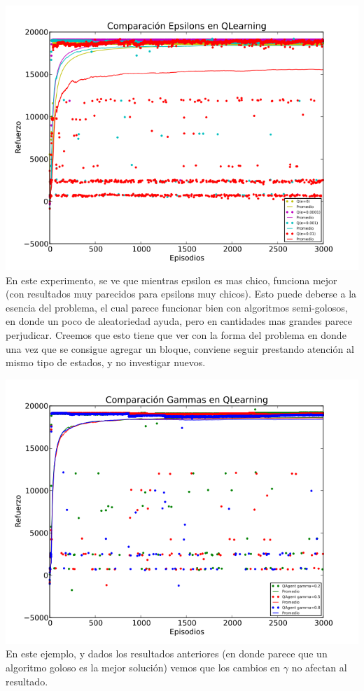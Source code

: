 \documentclass[11pt, a4paper]{article}
\begin{document}
\includegraphics[scale=0.6]{Graficos/epsilonsQ}
En este experimento, se ve que mientras epsilon es mas chico, funciona mejor (con resultados muy parecidos para epsilons muy chicos). Esto puede deberse a la esencia del problema, el cual parece funcionar bien con algoritmos semi-golosos, en donde un poco de aleatoriedad ayuda, pero en cantidades mas grandes parece perjudicar. Creemos que esto tiene que ver con la forma del problema en donde una vez que se consigue agregar un bloque, conviene seguir prestando atenci\'on al mismo tipo de estados, y no investigar nuevos. 

\includegraphics[scale=0.6]{Graficos/gammasQ}
En este ejemplo, y dados los resultados anteriores (en donde parece que un algoritmo goloso es la mejor soluci\'on) vemos que los cambios en $\gamma$ no afectan al resultado.
\end{document}
